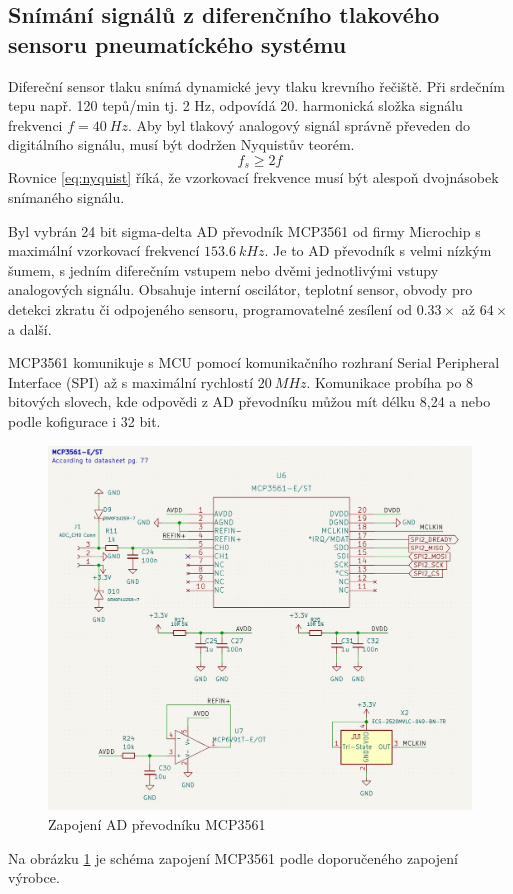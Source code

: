 \subsection{Snímání signálů z diferenčního tlakového sensoru pneumatíckého systému}
Difereční sensor tlaku snímá dynamické jevy tlaku krevního řečiště. Při srdečním tepu např. 120 tepů/min tj. 2 Hz, odpovídá 20. harmonická složka signálu frekvenci  $f = 40 \ Hz$. Aby byl tlakový analogový signál správně převeden do digitálního signálu, musí být dodržen Nyquistův teorém.
\begin{equation} \label{eq:nyquist}
    f_s \geq 2f
\end{equation}
Rovnice \ref{eq:nyquist} říká, že vzorkovací frekvence musí být alespoň dvojnásobek snímaného signálu.
\par
Byl vybrán 24 bit sigma-delta AD převodník MCP3561 od firmy Microchip s maximální vzorkovací frekvencí $153.6 \ kHz$. Je to AD převodník s velmi nízkým šumem, s jedním diferečním vstupem nebo dvěmi jednotlivými vstupy analogových signálu.
Obsahuje interní oscilátor, teplotní sensor, obvody pro detekci zkratu či odpojeného sensoru, programovatelné zesílení od $0.33 \times$ až $64 \times$ a další.
\par
MCP3561 komunikuje s MCU pomocí komunikačního rozhraní Serial Peripheral Interface (SPI) až s maximální rychlostí $20 \ MHz$. Komunikace probíha po 8 bitových slovech, kde odpovědi z AD převodníku můžou mít délku 8,24 a nebo podle kofigurace i 32 bit.
\begin{figure}[H]
    \centering
    \caption{Zapojení AD převodníku MCP3561}
    \label{fig:mcp3561_connection}
    \includegraphics[width=1\linewidth]{pictures/mcp3561_connection.jpg}
\end{figure}
Na obrázku \ref{fig:mcp3561_connection} je schéma zapojení MCP3561 podle doporučeného zapojení výrobce.
